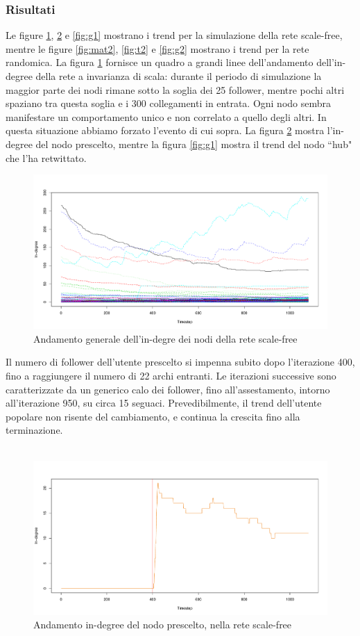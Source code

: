 \documentclass[a4paper,12pt]{article}
\begin{document}
\subsubsection{Risultati}
Le figure \ref{fig:mat1}, \ref{fig:t1} e \ref{fig:g1} mostrano i trend per la simulazione della rete scale-free, mentre le figure \ref{fig:mat2}, \ref{fig:t2} e \ref{fig:g2} mostrano i trend per la rete randomica.
La figura \ref{fig:mat1} fornisce un quadro a grandi linee dell'andamento dell'in-degree della rete a invarianza di scala: durante il periodo di simulazione la maggior parte dei nodi rimane sotto la soglia dei 25 follower, mentre pochi altri spaziano tra questa soglia e i 300 collegamenti in entrata. Ogni nodo sembra manifestare un comportamento unico e non correlato a quello degli altri. In questa situazione abbiamo forzato l'evento di cui sopra. La figura \ref{fig:t1} mostra l'in-degree del nodo prescelto, mentre la figura \ref{fig:g1} mostra il trend del nodo ``hub" che l'ha retwittato. 
\begin{figure}[H]
\centering
\includegraphics[scale=0.5]{images/totale_1000_sf_1080_1.pdf}
\caption{Andamento generale dell'in-degre dei nodi della rete scale-free}
\label{fig:mat1}
\end{figure}
Il numero di follower dell'utente prescelto si impenna subito dopo l'iterazione 400, fino a raggiungere il numero di 22 archi entranti. Le iterazioni successive sono caratterizzate da un generico calo dei follower, fino all'assestamento, intorno all'iterazione 950, su circa 15 seguaci. Prevedibilmente, il trend dell'utente popolare non risente del cambiamento, e continua la crescita fino alla terminazione. \\ \\
\begin{figure}[H]
\centering
\includegraphics[scale=0.5]{images/prescelto_1000_sf_1080_1.pdf}
\caption{Andamento in-degree del nodo prescelto, nella rete scale-free}
\label{fig:t1}
\end{figure}
\end{document}

